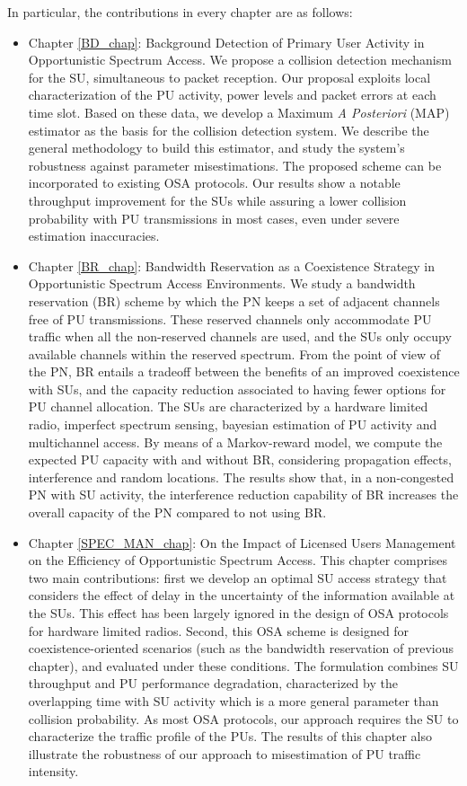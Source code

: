 In particular, the contributions in every chapter are as follows:
\begin{itemize}
\item Chapter \ref{BD_chap}: Background Detection of Primary User Activity in Opportunistic Spectrum Access. 
We propose a collision detection mechanism for the SU, simultaneous to packet reception. 
Our proposal exploits local characterization of the PU activity, power levels and packet errors at each time slot. 
Based on these data, we develop a Maximum \textit{A Posteriori} (MAP) estimator as the basis for the collision detection system. We describe the general methodology to build this estimator, and study the system's robustness against parameter misestimations. 
The proposed scheme can be incorporated to existing OSA protocols. 
Our results show a notable throughput improvement for the SUs while assuring a lower collision probability with PU transmissions in most cases, even under severe estimation inaccuracies.


\item Chapter \ref{BR_chap}: Bandwidth Reservation as a Coexistence Strategy in Opportunistic Spectrum Access Environments. We study a bandwidth reservation (BR) scheme by which the PN keeps a set of adjacent channels free of PU transmissions. 
These reserved channels only accommodate PU traffic when all the non-reserved channels are used, and the SUs only occupy available channels within the reserved spectrum.
From the point of view of the PN, BR entails a tradeoff between the benefits of an improved coexistence with SUs, and the capacity reduction associated to having fewer options for PU channel allocation.
The SUs are characterized by a hardware limited radio, imperfect spectrum sensing, bayesian estimation of PU activity and multichannel access. 
By means of a Markov-reward model, we compute the expected PU capacity with and without BR, considering propagation effects, interference and random locations.
The results show that, in a non-congested PN with SU activity, the interference reduction capability of BR increases the overall capacity of the PN compared to not using BR.

\item Chapter \ref{SPEC_MAN_chap}: On the Impact of Licensed Users Management on the Efficiency of Opportunistic Spectrum Access.
This chapter comprises two main contributions: first we develop an optimal SU access strategy that considers the effect of delay in the uncertainty of the information available at the SUs. This effect has been largely ignored in the design of OSA protocols for hardware limited radios. Second, this OSA scheme is designed for coexistence-oriented scenarios (such as the bandwidth reservation of previous chapter), and evaluated under these conditions.
The formulation combines SU throughput and PU performance degradation, characterized by the overlapping time with SU activity which is a more general parameter than collision probability.    
As most OSA protocols, our approach requires the SU to characterize the traffic profile of the PUs. The results of this chapter also illustrate the robustness of our approach to misestimation of PU traffic intensity.


\end{itemize}

